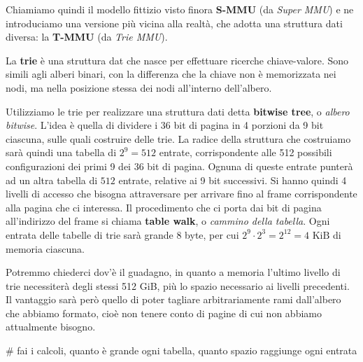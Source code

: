 \documentclass[a4paper,11pt]{article}
\begin{document}
Chiamiamo quindi il modello fittizio visto finora \textbf{S-MMU} (da \textit{Super MMU}) e ne introduciamo una versione più vicina alla realtà, che adotta una struttura dati diversa: la \textbf{T-MMU} (da \textit{Trie MMU}).

La \textbf{trie} è una struttura dat che nasce per effettuare ricerche chiave-valore.
Sono simili agli alberi binari, con la differenza che la chiave non è memorizzata nei nodi, ma nella posizione stessa dei nodi all'interno dell'albero.

Utilizziamo le trie per realizzare una struttura dati detta \textbf{bitwise tree}, o \textit{albero bitwise}.
L'idea è quella di dividere i 36 bit di pagina in 4 porzioni da 9 bit ciascuna, sulle quali costruire delle trie.
La radice della struttura che costruiamo sarà quindi una tabella di $2^9 = 512$ entrate, corrispondente alle 512 possibili configurazioni dei primi 9 dei 36 bit di pagina.
Ognuna di queste entrate punterà ad un altra tabella di $512$ entrate, relative ai 9 bit successivi.
Si hanno quindi 4 livelli di accesso che bisogna attraversare per arrivare fino al frame corrispondente alla pagina che ci interessa.
Il procedimento che ci porta dai bit di pagina all'indirizzo del frame si chiama \textbf{table walk}, o \textit{cammino della tabella}.
Ogni entrata delle tabelle di trie sarà grande 8 byte, per cui $2^9 \cdot 2^3 = 2^{12} = 4\text{ KiB}$ di memoria ciascuna.

Potremmo chiederci dov'è il guadagno, in quanto a memoria l'ultimo livello di trie necessiterà degli stessi 512 GiB, più lo spazio necessario ai livelli precedenti.
Il vantaggio sarà però quello di poter tagliare arbitrariamente rami dall'albero che abbiamo formato, cioè non tenere conto di pagine di cui non abbiamo attualmente bisogno. 

# fai i calcoli, quanto è grande ogni tabella, quanto spazio raggiunge ogni entrata
\end{document}
